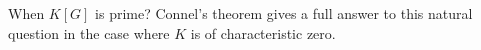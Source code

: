 \chapter{}



When $K[G]$ is prime? Connel's theorem gives a full answer to this natural
question in the case where $K$ is of characteristic zero. 

%
%
%
%
%
%
